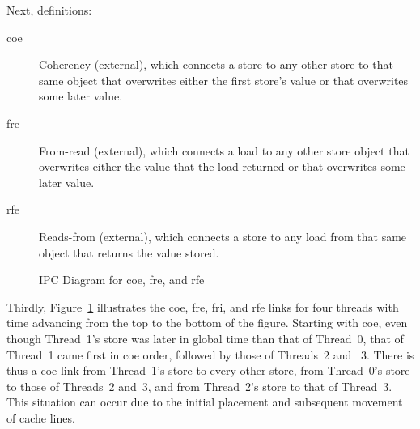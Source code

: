 \documentclass[10]{article}
\begin{document}
Next, definitions:

\begin{description}
\item[coe]
	Coherency (external), which connects a store to any other store
	to that same object that overwrites either the first store's
	value or that overwrites some later value.
\item[fre]
	From-read (external), which connects a load to any other store
	object that overwrites either the value that the load returned
	or that overwrites some later value.
\item[rfe]
	Reads-from (external), which connects a store to any load from
	that same object that returns the value stored.
\end{description}

\begin{figure}[tb]
\begin{center}
\caption{IPC Diagram for coe, fre, and rfe}
\label{fig:IPC Diagram for coe, fre, and rfe}
\end{center}
\end{figure}

Thirdly, Figure~\ref{fig:IPC Diagram for coe, fre, and rfe} illustrates
the coe, fre, fri, and rfe links for four threads with time advancing
from the top to the bottom of the figure.  Starting with coe, even though
Thread~1's store was later in global time than that of Thread~0, that of
Thread~1 came first in coe order, followed by those of Threads~2 and ~3.
There is thus a coe link from Thread~1's store to every other store,
from Thread~0's store to those of Threads~2 and~3, and from Thread~2's
store to that of Thread~3.
This situation can occur due to the initial placement and subsequent
movement of cache lines.
\end{document}
